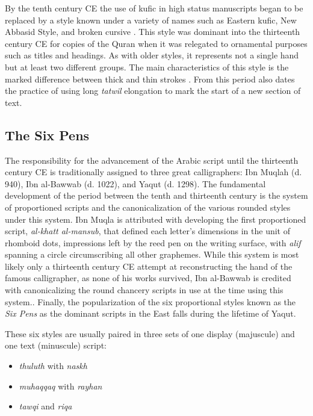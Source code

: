 By the tenth century CE the use of kufic in high status manuscripts began to be
replaced by a style known under a variety of names such as Eastern kufic, New
Abbasid Style, and broken cursive \cite[pg. 144]{blair2006islamic}. This style
was dominant into the thirteenth century CE for copies of the Quran when it was
relegated to ornamental purposes such as titles and headings. As with older
styles, it represents not a single hand but at least two different groups. The
main characteristics of this style is the marked difference between thick and
thin strokes \cite[pg. 167-168]{gacek2009arabic}. From this period also dates
the practice of using long \emph{tatwil} elongation to mark the start of a new
section of text\cite[pg. 165]{blair2006islamic}.

\subsection{The Six Pens}

The responsibility for the advancement of the Arabic script until the
thirteenth century CE is traditionally assigned to three great calligraphers:
Ibn Muqlah (d. 940), Ibn al-Bawwab (d. 1022), and Yaqut (d. 1298). The
fundamental development of the period between the tenth and thirteenth century
is the system of proportioned scripts and the canonicalization of the various
rounded styles under this system. Ibn Muqla is attributed with developing the
first proportioned script, \emph{al-khatt al-mansub}, that defined each
letter's dimensions in the unit of rhomboid dots, impressions left by the reed
pen on the writing surface, with \emph{alif} spanning a circle circumscribing
all other graphemes. While this system is most likely only a thirteenth century
CE attempt at reconstructing the hand of the famous calligrapher, as none of
his works survived, Ibn al-Bawwab is credited with canonicalizing the round
chancery scripts in use at the time using this system.\cite[pg. 158-160,
213]{blair2006islamic}. Finally, the popularization of the six proportional
styles known as the \emph{Six Pens} as the dominant scripts in the East falls
during the lifetime of Yaqut\cite[pg. 251]{gacek2009arabic}.

These six styles are usually paired in three sets of one display (majuscule)
and one text (minuscule) script:

\begin{itemize}
	\item \emph{thuluth} with \emph{naskh}
	\item \emph{muhaqqaq} with \emph{rayhan}
	\item \emph{tawqi} and \emph{riqa}
\end{itemize}


